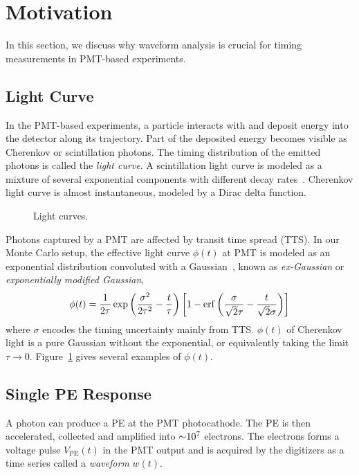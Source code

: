 \section{Motivation} %
\label{sec:toyMC}

In this section, we discuss why waveform analysis is crucial for timing measurements in PMT-based experiments. 

\subsection{Light Curve}
In the PMT-based experiments, a particle interacts with and deposit energy into the detector along its trajectory. Part of the deposited energy becomes visible as Cherenkov or scintillation photons.  The timing distribution of the emitted photons is called the \textit{light curve}.  A scintillation light curve is modeled as a mixture of several exponential components with different decay rates~\cite{ludhova_particle_2020}.  Cherenkov light curve is 
almost instantaneous, modeled by a Dirac delta function. 

\begin{figure}[!htb]
  \centering
  \resizebox{0.5\textwidth}{!}{}
  \caption{\label{fig:time-pro} Light curves.}
\end{figure}

Photons captured by a PMT are affected by transit time spread (TTS).  In our Monte Carlo setup, the effective light curve $\phi(t)$ at PMT is modeled as an exponential distribution convoluted with a Gaussian~\cite{li_separation_2016}, known as \textit{ex-Gaussian} or \textit{exponentially modified Gaussian}, 
\begin{align}
    \phi(t) = \frac{1}{2\tau} \exp\left(\frac{\sigma^2}{2\tau^2}-\frac{t}{\tau}\right) \left[1 - \operatorname{erf}\left( \frac{\sigma}{\sqrt{2}\tau} - \frac{t}{\sqrt{2}\sigma} \right)\right]
    \label{eq:time-pro}
\end{align}
where $\sigma$ encodes the timing uncertainty mainly from TTS.  $\phi(t)$ of Cherenkov light is a pure Gaussian without the exponential, or equivalently taking the limit $\tau \rightarrow 0$.  Figure~\ref{fig:time-pro} gives several examples of $\phi(t)$.

\subsection{Single PE Response}
\label{subsec:spe}

A photon can produce a PE at the PMT photocathode.  The PE is then accelerated, collected and amplified into $\num[retain-unity-mantissa=false]{\sim 1e7}$ electrons.  The electrons forms a voltage pulse $V_\mathrm{PE}(t)$ in the PMT output and is acquired by the digitizers as a time series called a \textit{waveform} $w(t)$.

